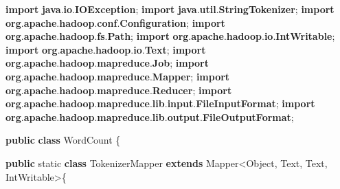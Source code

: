 \documentclass[
]{article}
\newenvironment{Shaded}{}{}
\newcommand{\BuiltInTok}[1]{\textcolor[rgb]{0.00,0.50,0.00}{#1}}
\newcommand{\DataTypeTok}[1]{\textcolor[rgb]{0.56,0.13,0.00}{#1}}
\newcommand{\ImportTok}[1]{\textcolor[rgb]{0.00,0.50,0.00}{\textbf{#1}}}
\newcommand{\KeywordTok}[1]{\textcolor[rgb]{0.00,0.44,0.13}{\textbf{#1}}}
\newcommand{\NormalTok}[1]{#1}
\newcommand{\OperatorTok}[1]{\textcolor[rgb]{0.40,0.40,0.40}{#1}}
\begin{document}
\begin{Shaded}
\begin{Highlighting}[]
\KeywordTok{import} \ImportTok{java}\OperatorTok{.}\ImportTok{io}\OperatorTok{.}\ImportTok{IOException}\OperatorTok{;}
\KeywordTok{import} \ImportTok{java}\OperatorTok{.}\ImportTok{util}\OperatorTok{.}\ImportTok{StringTokenizer}\OperatorTok{;}
\KeywordTok{import} \ImportTok{org}\OperatorTok{.}\ImportTok{apache}\OperatorTok{.}\ImportTok{hadoop}\OperatorTok{.}\ImportTok{conf}\OperatorTok{.}\ImportTok{Configuration}\OperatorTok{;}
\KeywordTok{import} \ImportTok{org}\OperatorTok{.}\ImportTok{apache}\OperatorTok{.}\ImportTok{hadoop}\OperatorTok{.}\ImportTok{fs}\OperatorTok{.}\ImportTok{Path}\OperatorTok{;}
\KeywordTok{import} \ImportTok{org}\OperatorTok{.}\ImportTok{apache}\OperatorTok{.}\ImportTok{hadoop}\OperatorTok{.}\ImportTok{io}\OperatorTok{.}\ImportTok{IntWritable}\OperatorTok{;}
\KeywordTok{import} \ImportTok{org}\OperatorTok{.}\ImportTok{apache}\OperatorTok{.}\ImportTok{hadoop}\OperatorTok{.}\ImportTok{io}\OperatorTok{.}\ImportTok{Text}\OperatorTok{;}
\KeywordTok{import} \ImportTok{org}\OperatorTok{.}\ImportTok{apache}\OperatorTok{.}\ImportTok{hadoop}\OperatorTok{.}\ImportTok{mapreduce}\OperatorTok{.}\ImportTok{Job}\OperatorTok{;}
\KeywordTok{import} \ImportTok{org}\OperatorTok{.}\ImportTok{apache}\OperatorTok{.}\ImportTok{hadoop}\OperatorTok{.}\ImportTok{mapreduce}\OperatorTok{.}\ImportTok{Mapper}\OperatorTok{;}
\KeywordTok{import} \ImportTok{org}\OperatorTok{.}\ImportTok{apache}\OperatorTok{.}\ImportTok{hadoop}\OperatorTok{.}\ImportTok{mapreduce}\OperatorTok{.}\ImportTok{Reducer}\OperatorTok{;}
\KeywordTok{import} \ImportTok{org}\OperatorTok{.}\ImportTok{apache}\OperatorTok{.}\ImportTok{hadoop}\OperatorTok{.}\ImportTok{mapreduce}\OperatorTok{.}\ImportTok{lib}\OperatorTok{.}\ImportTok{input}\OperatorTok{.}\ImportTok{FileInputFormat}\OperatorTok{;}
\KeywordTok{import} \ImportTok{org}\OperatorTok{.}\ImportTok{apache}\OperatorTok{.}\ImportTok{hadoop}\OperatorTok{.}\ImportTok{mapreduce}\OperatorTok{.}\ImportTok{lib}\OperatorTok{.}\ImportTok{output}\OperatorTok{.}\ImportTok{FileOutputFormat}\OperatorTok{;}

\KeywordTok{public} \KeywordTok{class}\NormalTok{ WordCount }\OperatorTok{\{}

  \KeywordTok{public} \DataTypeTok{static} \KeywordTok{class}\NormalTok{ TokenizerMapper }\KeywordTok{extends}\NormalTok{ Mapper}\OperatorTok{\textless{}}\BuiltInTok{Object}\OperatorTok{,} \BuiltInTok{Text}\OperatorTok{,} \BuiltInTok{Text}\OperatorTok{,}\NormalTok{ IntWritable}\OperatorTok{\textgreater{}\{}


\end{Highlighting}
\end{Shaded}
\end{document}
